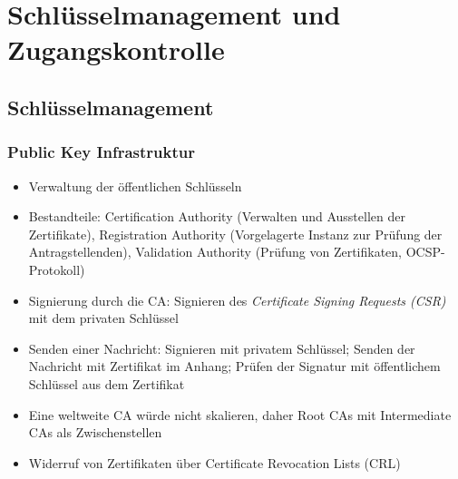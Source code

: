 \section{Schlüsselmanagement und Zugangskontrolle}

\subsection{Schlüsselmanagement}

\subsubsection{Public Key Infrastruktur}
\begin{itemize}
	\item Verwaltung der öffentlichen Schlüsseln
	\item Bestandteile: Certification Authority (Verwalten und Ausstellen der Zertifikate), Registration Authority (Vorgelagerte Instanz zur Prüfung der Antragstellenden), Validation Authority (Prüfung von Zertifikaten, OCSP-Protokoll)
	\item Signierung durch die CA: Signieren des \textit{Certificate Signing Requests (CSR)} mit dem privaten Schlüssel
	\item Senden einer Nachricht: Signieren mit privatem Schlüssel; Senden der Nachricht mit Zertifikat im Anhang; Prüfen der Signatur mit öffentlichem Schlüssel aus dem Zertifikat
	\item Eine weltweite CA würde nicht skalieren, daher Root CAs mit Intermediate CAs als Zwischenstellen
	\item Widerruf von Zertifikaten über Certificate Revocation Lists (CRL)
\end{itemize}

